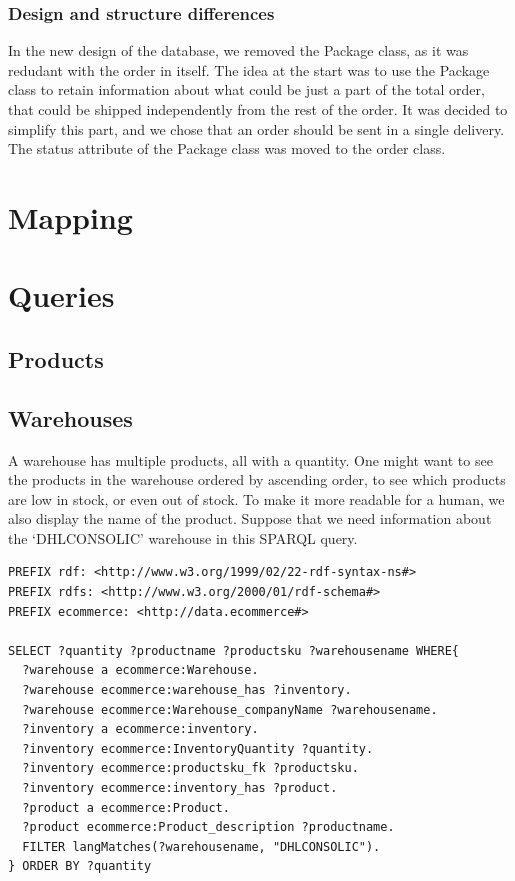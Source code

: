 \documentclass{article}
\begin{document}
\subsubsection{Design and structure differences}
In the new design of the database, we removed the Package class, as it was redudant with the order in itself. The idea at the start was to use the Package class to retain information about what could be just a part of the total order, that could be shipped independently from the rest of the order. It was decided to simplify this part, and we chose that an order should be sent in a single delivery. The status attribute of the Package class was moved to the order class.

\section{Mapping}


\section{Queries}


\subsection{Products}




\subsection{Warehouses}
A warehouse has multiple products, all with a quantity. One might want to see the products in the warehouse ordered by ascending order, to see which products are low in stock, or even out of stock. To make it more readable for a human, we also display the name of the product. Suppose that we need information about the `DHLCONSOLIC' warehouse in this SPARQL query.

\begin{lstlisting}[breaklines, frame=single]
PREFIX rdf: <http://www.w3.org/1999/02/22-rdf-syntax-ns#>
PREFIX rdfs: <http://www.w3.org/2000/01/rdf-schema#>
PREFIX ecommerce: <http://data.ecommerce#>

SELECT ?quantity ?productname ?productsku ?warehousename WHERE{
  ?warehouse a ecommerce:Warehouse.
  ?warehouse ecommerce:warehouse_has ?inventory.
  ?warehouse ecommerce:Warehouse_companyName ?warehousename.
  ?inventory a ecommerce:inventory.
  ?inventory ecommerce:InventoryQuantity ?quantity.
  ?inventory ecommerce:productsku_fk ?productsku.
  ?inventory ecommerce:inventory_has ?product.
  ?product a ecommerce:Product.
  ?product ecommerce:Product_description ?productname.
  FILTER langMatches(?warehousename, "DHLCONSOLIC").
} ORDER BY ?quantity
\end{lstlisting}
\end{document}
